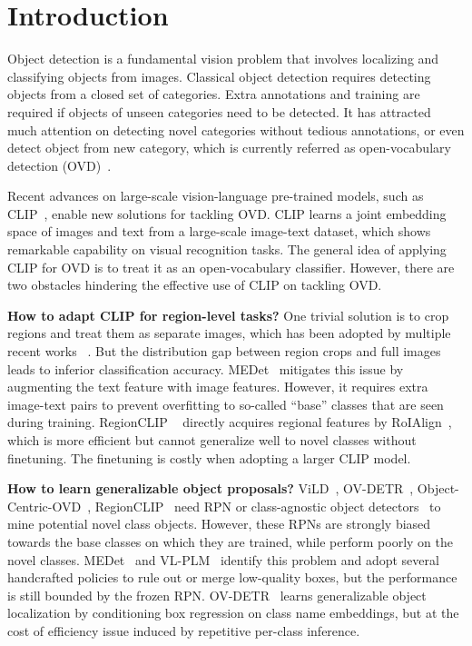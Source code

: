 \documentclass[10pt,twocolumn,letterpaper]{article}
\begin{document}
\section{Introduction}
\label{sec:introduction}



Object detection is a fundamental vision problem that involves localizing and classifying objects from images.
Classical object detection requires detecting objects from a closed set of categories. 
Extra annotations and training are required if objects of unseen categories need to be detected. 
It has attracted much attention on detecting novel categories without tedious annotations, or even detect object from new category, which is currently referred as open-vocabulary detection (OVD)~\cite{OVRCNN}.


Recent advances on large-scale vision-language pre-trained models, such as CLIP~\cite{clip}, enable new solutions for tackling OVD.
CLIP learns a joint embedding space of images and text from a large-scale image-text dataset, which shows remarkable capability on visual recognition tasks. 
The general idea of applying CLIP for OVD is to treat it as an open-vocabulary classifier.
However, there are two obstacles hindering the effective use of CLIP on tackling OVD.


\noindent\textbf{How to adapt CLIP for region-level tasks?}
One trivial solution is to crop regions and treat them as separate images, which has been adopted by multiple recent works ~\cite{vild, OVDETR, medet, bridging}. 
But the distribution gap between region crops and full images leads to inferior classification accuracy. 
MEDet~\cite{medet} mitigates this issue by augmenting the text feature with image features.
However, it requires extra image-text pairs to prevent overfitting to so-called ``base'' classes that are seen during training.
RegionCLIP ~\cite{regionclip} directly acquires regional features by RoIAlign~\cite{maskrcnn}, which is more efficient but cannot generalize well to novel classes without finetuning. The finetuning is costly when adopting a larger CLIP model.

\noindent\textbf{How to learn generalizable object proposals?} 
ViLD~\cite{vild}, OV-DETR~\cite{OVDETR}, Object-Centric-OVD~\cite{bridging}, RegionCLIP~\cite{regionclip} need RPN or class-agnostic object detectors~\cite{mvit} to mine potential novel class objects.
However, these RPNs are strongly biased towards the base classes on which they are trained, while perform poorly on the novel classes.
MEDet~\cite{medet} and VL-PLM~\cite{vlplm} identify this problem and adopt several handcrafted policies to rule out or merge low-quality boxes, but the performance is still bounded by the frozen RPN. 
OV-DETR~\cite{OVDETR} learns generalizable object localization by conditioning box regression on class name embeddings, but at the cost of efficiency issue induced by repetitive per-class inference.
\end{document}
